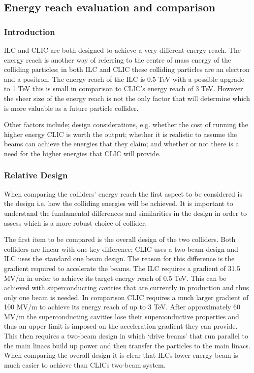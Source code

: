 \subsection{Energy reach evaluation and comparison}

\subsubsection{Introduction}
ILC and CLIC are both designed to achieve a very different energy reach. The energy reach is another way of referring to the centre of mass energy of the colliding particles; in both ILC and CLIC these colliding particles are an electron and a positron.  The energy reach of the ILC is 0.5 TeV with a possible upgrade to 1 TeV this is small in comparison to CLIC's energy reach of 3 TeV. However the sheer size of the energy reach is not the only factor that will determine which is more valuable as a future particle collider.

Other factors include; design considerations, e.g. whether the cost of running the higher energy CLIC is worth the output; whether it is realistic to assume the beams can achieve the energies that they claim; and whether or not there is a need for the higher energies that CLIC will provide.

\subsubsection{Relative Design}
When comparing the colliders' energy reach the first aspect to be considered is the design i.e. how the colliding energies will be achieved. It is important to understand the fundamental differences and similarities in the design in order to assess which is a more robust choice of collider.

The first item to be compared is the overall design of the two colliders. Both colliders are linear with one key difference; CLIC uses a two-beam design and ILC uses the standard one beam design. The reason for this difference is the gradient required to accelerate the beams. The ILC requires a gradient of 31.5 MV/m\cite{ILC:ReferenceDesignReport} in order to achieve its target energy reach of 0.5 TeV. This can be achieved with superconducting cavities that are currently in production and thus only one beam is needed. In comparison CLIC requires a much larger gradient of 100 MV/m to achieve its energy reach of up to 3 TeV\cite{CLIC:ParameterList}. After approximately 60 MV/m the superconducting cavities lose their superconductive properties and thus an upper limit is imposed on the acceleration gradient they can provide. This then requires a two-beam design in which `drive beams' that run parallel to the main linacs build up power and then transfer the particles to the main linacs. When comparing the overall design it is clear that ILCs lower energy beam is much easier to achieve than CLICs two-beam system.


